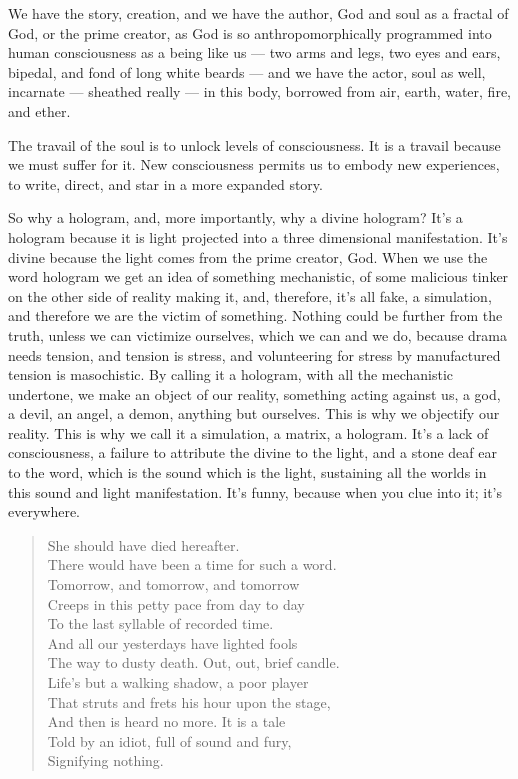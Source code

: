 We have the story, creation, and we have the author, God and soul as a
fractal of God, or the prime creator, as God is so anthropomorphically
programmed into human consciousness as a being like us --- two arms and
legs, two eyes and ears, bipedal, and fond of long white beards --- and
we have the actor, soul as well, incarnate --- sheathed really --- in
this body, borrowed from air, earth, water, fire, and ether.

The travail of the soul is to unlock levels of consciousness. It is a
travail because we must suffer for it. New consciousness permits us to
embody new experiences, to write, direct, and star in a more expanded
story.

So why a hologram, and, more importantly, why a divine hologram? It's a
hologram because it is light projected into a three dimensional
manifestation. It's divine because the light comes from the prime
creator, God. When we use the word hologram we get an idea of something
mechanistic, of some malicious tinker on the other side of reality
making it, and, therefore, it's all fake, a simulation, and therefore we
are the victim of something. Nothing could be further from the truth,
unless we can victimize ourselves, which we can and we do, because drama
needs tension, and tension is stress, and volunteering for stress by
manufactured tension is masochistic. By calling it a hologram, with all
the mechanistic undertone, we make an object of our reality, something
acting against us, a god, a devil, an angel, a demon, anything but
ourselves. This is why we objectify our reality. This is why we call it
a simulation, a matrix, a hologram. It's a lack of consciousness, a
failure to attribute the divine to the light, and a stone deaf ear to
the word, which is the sound which is the light, sustaining all the
worlds in this sound and light manifestation. It's funny, because when
you clue into it; it's everywhere.

\begin{quote}
She should have died hereafter.\\
There would have been a time for such a word.\\
Tomorrow, and tomorrow, and tomorrow\\
Creeps in this petty pace from day to day\\
To the last syllable of recorded time.\\
And all our yesterdays have lighted fools\\
The way to dusty death. Out, out, brief candle.\\
Life’s but a walking shadow, a poor player\\
That struts and frets his hour upon the stage,\\
And then is heard no more. It is a tale\\
Told by an idiot, full of sound and fury,\\
Signifying nothing.
\end{quote}

